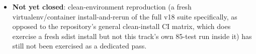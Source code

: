 \documentclass[11pt]{amsart}
\begin{document}
\begin{itemize}[leftmargin=*]
  requires-zero-gap, screening-cannot-certify, etc.) are now enforced as
  real code (\texttt{src/seion\_core/governance/evidence\_contract.py})
  with 23 passing mutation tests, plus a sha256-hash-pinned schema-drift
  detector, hand-verified to actually catch tampering (a schema file was
  deliberately edited, the drift test confirmed to fail, then restored
  and confirmed to pass again).
\item \textbf{Not yet closed}: clean-environment reproduction (a fresh
  virtualenv/container install-and-rerun of the full v18 suite
  specifically, as opposed to the repository's general clean-install CI
  matrix, which does exercise a fresh sdist install but not this track's
  own 85-test run inside it) has still not been exercised as a dedicated
  pass.
\end{itemize}
\end{document}
